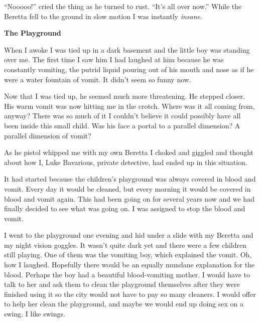 ``Nooooo!'' cried the thing as he turned to rust. ``It's all over
now.'' While the Beretta fell to the ground in slow motion I was
instantly {\em insane}. 
 





{\bf The Playground}



When I awoke I was tied up in a dark basement and the little boy
was standing over me. The first time I saw him I had laughed at him
because he was constantly vomiting, the putrid liquid pouring out
of his mouth and nose as if he were a water fountain of vomit. It
didn't seem so funny now.



Now that I was tied up, he seemed much more threatening. He stepped
closer. His warm vomit was now hitting me in the crotch. Where was
it all coming from, anyway? There was so much of it I
couldn't believe it could possibly have all been inside this
small child. Was his face a portal to a parallel dimension? A
parallel dimension of vomit?



As he pistol whipped me with my own Beretta I choked and giggled
and thought about how I, Luke Bavarious, private detective, had
ended up in this situation.



It had started because the children's playground was always
covered in blood and vomit. Every day it would be cleaned, but
every morning it would be covered in blood and vomit again. This
had been going on for several years now and we had finally decided
to see what was going on. I was assigned to stop the blood and
vomit.



I went to the playground one evening and hid under a slide with my
Beretta and my night vision goggles. It wasn't quite dark yet
and there were a few children still playing. One of them was the
vomiting boy, which explained the vomit. Oh, how I laughed.
Hopefully there would be an equally mundane explanation for the
blood. Perhaps the boy had a beautiful blood-vomiting mother. I
would have to talk to her and ask them to clean the playground
themselves after they were finished using it so the city would not
have to pay so many cleaners. I would offer to help her clean the
playground, and maybe we would end up doing sex on a swing. I like
swings.



